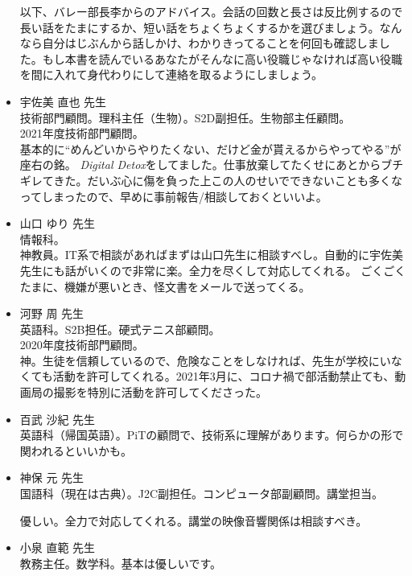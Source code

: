 \documentclass[dvipdfmx,jb5]{jreport}
\begin{document}
\begin{itemize}
            以下、バレー部長李からのアドバイス。会話の回数と長さは反比例するので長い話をたまにするか、短い話をちょくちょくするかを選びましょう。なんなら自分はじぶんから話しかけ、わかりきってることを何回も確認しました。もし本書を読んでいるあなたがそんなに高い役職じゃなければ高い役職を間に入れて身代わりにして連絡を取るようにしましょう。

      \item 宇佐美 直也 先生\\
            技術部門顧問。理科主任（生物）。S2D副担任。生物部主任顧問。\\
            2021年度技術部門顧問。\\
            基本的に``めんどいからやりたくない、だけど金が貰えるからやってやる''が座右の銘。
            \textit{Digital Detox}をしてました。仕事放棄してたくせにあとからブチギレてきた。だいぶ心に傷を負った上この人のせいでできないことも多くなってしまったので、早めに事前報告/相談しておくといいよ。

      \item 山口 ゆり 先生\\
            情報科。\\
            神教員。IT系で相談があればまずは山口先生に相談すべし。自動的に宇佐美先生にも話がいくので非常に楽。全力を尽くして対応してくれる。
            ごくごくたまに、機嫌が悪いとき、怪文書をメールで送ってくる。

      \item 河野 周 先生\\
            英語科。S2B担任。硬式テニス部顧問。\\
            2020年度技術部門顧問。\\
            神。生徒を信頼しているので、危険なことをしなければ、先生が学校にいなくても活動を許可してくれる。2021年3月に、コロナ禍で部活動禁止ても、動画局の撮影を特別に活動を許可してくださった。

      \item 百武 沙紀 先生\\
            英語科（帰国英語）。PiTの顧問で、技術系に理解があります。何らかの形で関われるといいかも。

      \item 神保 元 先生\\
            国語科（現在は古典）。J2C副担任。コンピュータ部副顧問。講堂担当。

            優しい。全力で対応してくれる。講堂の映像音響関係は相談すべき。

      \item 小泉 直範 先生\\
            教務主任。数学科。基本は優しいです。


\end{itemize}
\end{document}
